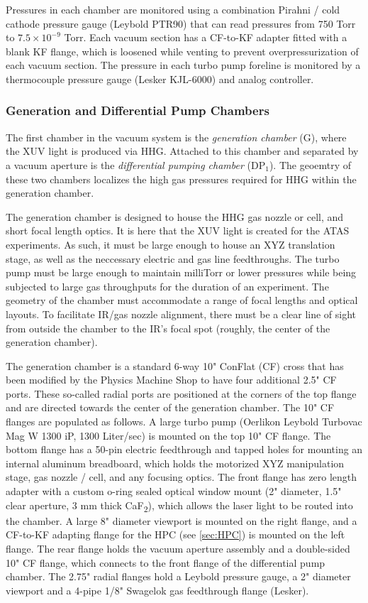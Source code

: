 Pressures in each chamber are monitored using a combination Pirahni / cold cathode pressure gauge (Leybold PTR90) that can read pressures from 750 Torr to $7.5 \times 10^{-9}$ Torr. Each vacuum section has a CF-to-KF adapter fitted with a blank KF flange, which is loosened while venting to prevent overpressurization of each vacuum section. The pressure in each turbo pump foreline is monitored by a thermocouple pressure gauge (Lesker KJL-6000) and analog controller.

\subsubsection{Generation and Differential Pump Chambers}

The first chamber in the vacuum system is the \textit{generation chamber} (G), where the XUV light is produced via HHG. Attached to this chamber and separated by a vacuum aperture is the \textit{differential pumping chamber} (DP$_1$). The geoemtry of these two chambers localizes the high gas pressures required for HHG within the generation chamber.

The generation chamber is designed to house the HHG gas nozzle or cell, and short focal length optics. It is here that the XUV light is created for the ATAS experiments. As such, it must be large enough to house an XYZ translation stage, as well as the neccessary electric and gas line feedthroughs. The turbo pump must be large enough to maintain milliTorr or lower pressures while being subjected to large gas throughputs for the duration of an experiment. The geometry of the chamber must accommodate a range of focal lengths and optical layouts. To facilitate IR/gas nozzle alignment, there must be a clear line of sight from outside the chamber to the IR's focal spot (roughly, the center of the generation chamber).

The generation chamber is a standard 6-way 10" ConFlat (CF) cross that has been modified by the Physics Machine Shop to have four additional 2.5" CF ports. These so-called radial ports are positioned at the corners of the top flange and are directed towards the center of the generation chamber. The 10" CF flanges are populated as follows. A large turbo pump (Oerlikon Leybold Turbovac Mag W 1300 iP, 1300 Liter/sec) is mounted on the top 10" CF flange. The bottom flange has a 50-pin electric feedthrough and tapped holes for mounting an internal aluminum breadboard, which holds the motorized XYZ manipulation stage, gas nozzle / cell, and any focusing optics. The front flange has zero length adapter with a custom o-ring sealed optical window mount (2" diameter, 1.5" clear aperture, 3 mm thick CaF\textsubscript{2}), which allows the laser light to be routed into the chamber. A large 8" diameter viewport is mounted on the right flange, and a CF-to-KF adapting flange for the HPC (see \cref{sec:HPC}) is mounted on the left flange. The rear flange holds the vacuum aperture assembly and a double-sided 10" CF flange, which connects to the front flange of the differential pump chamber. The 2.75" radial flanges hold a Leybold pressure gauge, a 2" diameter viewport and a 4-pipe 1/8" Swagelok gas feedthrough flange (Lesker).

